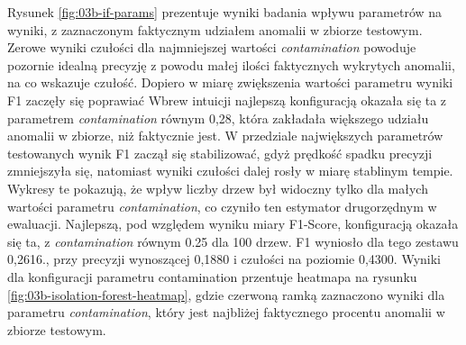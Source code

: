 \documentclass[a4paper,twoside,12pt]{book}
\begin{document}
	Rysunek \ref{fig:03b-if-params} prezentuje wyniki  badania wpływu parametrów na wyniki, z zaznaczonym faktycznym udziałem anomalii w zbiorze testowym. Zerowe wyniki czułości dla najmniejszej wartości \textit{contamination} powoduje pozornie idealną precyzję z powodu małej ilości faktycznych wykrytych anomalii, na co wskazuje czułość. Dopiero w miarę zwiększenia wartości parametru wyniki F1 zaczęły się poprawiać  Wbrew intuicji najlepszą konfiguracją okazała się ta z parametrem \textit{contamination} równym 0{,}28, która zakładała większego udziału anomalii w zbiorze, niż faktycznie jest. W przedziale największych parametrów testowanych wynik F1 zaczął się stabilizować, gdyż prędkość spadku precyzji zmniejszyła się, natomiast wyniki czułości dalej rosły w miarę stablinym tempie. Wykresy te pokazują, że wpływ liczby drzew był widoczny tylko dla małych wartości parametru \textit{contamination}, co czyniło ten estymator drugorzędnym w ewaluacji. Najlepszą, pod względem wyniku miary F1-Score, konfiguracją okazała się ta, z \textit{contamination} równym 0.25 dla 100 drzew. F1 wyniosło dla tego zestawu 0{,}2616., przy precyzji wynoszącej 0{,}1880 i czułości na poziomie 0{,}4300. Wyniki dla konfiguracji parametru contamination przentuje heatmapa na rysunku \ref{fig:03b-isolation-forest-heatmap}, gdzie czerwoną ramką zaznaczono wyniki dla parametru \textit{contamination}, który jest najbliżej faktycznego procentu anomalii w zbiorze testowym. 
	
\end{document}
